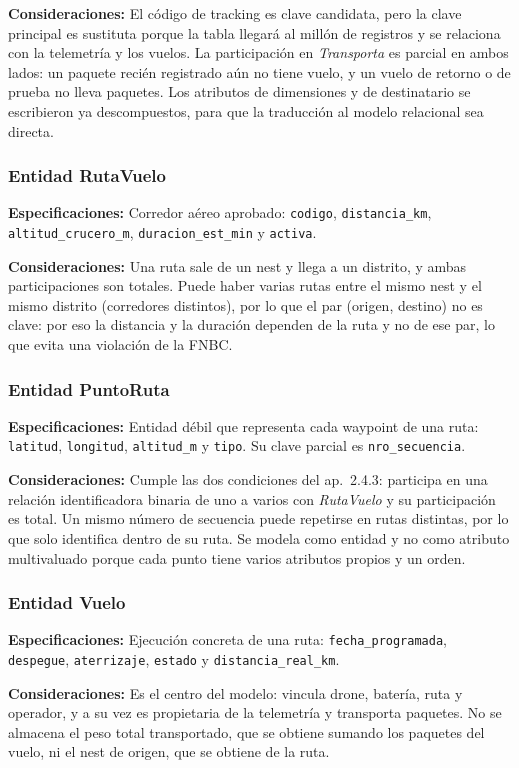 \documentclass[11pt,a4paper]{article}
\newcommand{\at}[1]{\texttt{#1}}
\begin{document}
\textbf{Consideraciones:} El código de tracking es clave candidata, pero la clave principal es sustituta porque la tabla llegará al millón de registros y se relaciona con la telemetría y los vuelos. La participación en \textit{Transporta} es parcial en ambos lados: un paquete recién registrado aún no tiene vuelo, y un vuelo de retorno o de prueba no lleva paquetes. Los atributos de dimensiones y de destinatario se escribieron ya descompuestos, para que la traducción al modelo relacional sea directa.

\subsubsection{Entidad RutaVuelo}
\textbf{Especificaciones:} Corredor aéreo aprobado: \at{codigo}, \at{distancia\_km}, \at{altitud\_crucero\_m}, \at{duracion\_est\_min} y \at{activa}.

\textbf{Consideraciones:} Una ruta sale de un nest y llega a un distrito, y ambas participaciones son totales. Puede haber varias rutas entre el mismo nest y el mismo distrito (corredores distintos), por lo que el par (origen, destino) no es clave: por eso la distancia y la duración dependen de la ruta y no de ese par, lo que evita una violación de la FNBC.

\subsubsection{Entidad PuntoRuta}
\textbf{Especificaciones:} Entidad débil que representa cada waypoint de una ruta: \at{latitud}, \at{longitud}, \at{altitud\_m} y \at{tipo}. Su clave parcial es \at{nro\_secuencia}.

\textbf{Consideraciones:} Cumple las dos condiciones del ap.~2.4.3: participa en una relación identificadora binaria de uno a varios con \textit{RutaVuelo} y su participación es total. Un mismo número de secuencia puede repetirse en rutas distintas, por lo que solo identifica dentro de su ruta. Se modela como entidad y no como atributo multivaluado porque cada punto tiene varios atributos propios y un orden.

\subsubsection{Entidad Vuelo}
\textbf{Especificaciones:} Ejecución concreta de una ruta: \at{fecha\_programada}, \at{despegue}, \at{aterrizaje}, \at{estado} y \at{distancia\_real\_km}.

\textbf{Consideraciones:} Es el centro del modelo: vincula drone, batería, ruta y operador, y a su vez es propietaria de la telemetría y transporta paquetes. No se almacena el peso total transportado, que se obtiene sumando los paquetes del vuelo, ni el nest de origen, que se obtiene de la ruta.
\end{document}
